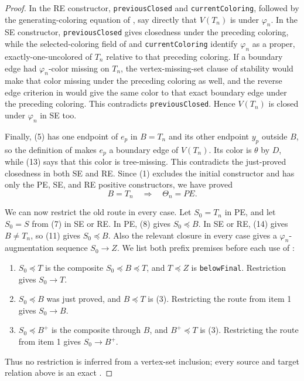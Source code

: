 \begin{proof}
In the RE constructor, \texttt{previousClosed} and
\texttt{currentColoring}, followed by the generating-coloring equation of
, say directly that \(V(T_n)\) is
 under \(\varphi_n\).  In the SE
constructor, \texttt{previousClosed} gives closedness under the preceding
coloring, while the selected-coloring field of
 and \texttt{currentColoring} identify
\(\varphi_n\) as a proper, exactly-one-uncolored
 of \(T_n\) relative to that preceding coloring.
If a boundary edge had \(\varphi_n\)-color missing on \(T_n\), the
vertex-missing-set clause of stability would make that color missing under
the preceding coloring as well, and the reverse edge criterion in
 would give the same color to that exact boundary edge under
the preceding coloring.  This contradicts \texttt{previousClosed}.  Hence
\(V(T_n)\) is closed under \(\varphi_n\) in SE too.

Finally, (5) has one endpoint of \(e_p\) in \(B=T_n\) and its other
endpoint \(y_p\) outside \(B\), so the definition of
 makes \(e_p\) a boundary edge of \(V(T_n)\).
Its color is \(\theta\) by \(D\), while (13) says that this color is
tree-missing.  This contradicts the just-proved closedness in both SE and
RE.  Since (1) excludes the initial constructor and
 has only the PE, SE, and RE positive
constructors, we have proved
\[
              B=T_n\quad\Longrightarrow\quad\Theta_n=PE.    \tag{14}
\]

We can now restrict the old route in every case.  Let \(S_0=T_n\) in PE,
and let \(S_0=S\) from (7) in SE or RE.  In PE, (8) gives
\(S_0\preccurlyeq B\).  In SE or RE, (14) gives \(B\ne T_n\), so (11)
gives \(S_0\preccurlyeq B\).  Also the relevant closure in every case
gives a \(\varphi_n\)-augmentation sequence \(S_0\longrightarrow Z\).
We list both prefix premises before each use of
:
\begin{enumerate}
\item \(S_0\preccurlyeq T\) is the composite
\(S_0\preccurlyeq B\preccurlyeq T\), and
\(T\preccurlyeq Z\) is \texttt{belowFinal}.  Restriction gives
\(S_0\longrightarrow T\).
\item \(S_0\preccurlyeq B\) was just proved, and
\(B\preccurlyeq T\) is (3).  Restricting the route from item 1 gives
\(S_0\longrightarrow B\).
\item \(S_0\preccurlyeq B^+\) is the composite through \(B\), and
\(B^+\preccurlyeq T\) is (3).  Restricting the route from item 1 gives
\(S_0\longrightarrow B^+\).
\end{enumerate}
Thus no restriction is inferred from a vertex-set inclusion; every source
and target relation above is an exact
.


\end{proof}
